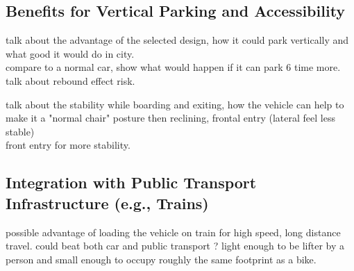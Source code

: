 \subsection{Benefits for Vertical Parking and Accessibility}
talk about the advantage of the selected design, how it could park vertically and what good it would do in city.\\

compare to a normal car, show what would happen if it can park 6 time more. talk about rebound effect risk.

talk about the stability while boarding and exiting, how the vehicle can help to make it a "normal chair" posture then reclining, frontal entry (lateral feel less stable)\\
front entry for more stability.

\subsection{Integration with Public Transport Infrastructure (e.g., Trains)}
possible advantage of loading the vehicle on train for high speed, long distance travel. could beat both car and public transport ? light enough to be lifter by a person  and small enough to occupy roughly the same footprint as a bike.